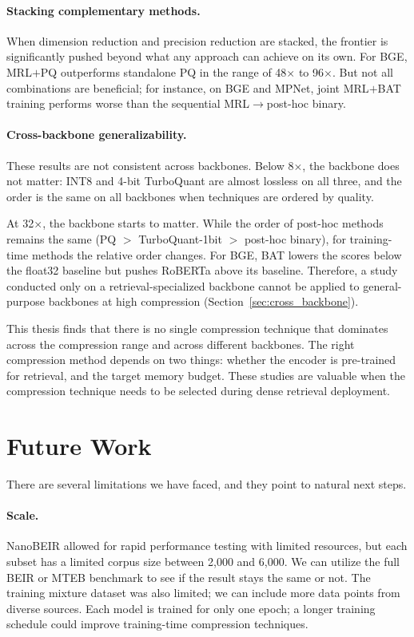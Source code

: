 \paragraph{Stacking complementary methods.}
When dimension reduction and precision reduction are stacked, the
frontier is significantly pushed beyond what any approach can achieve
on its own. For BGE, MRL$+$PQ outperforms standalone PQ in the range
of 48$\times$ to 96$\times$. But not all combinations are beneficial;
for instance, on BGE and MPNet, joint MRL$+$BAT training performs
worse than the sequential MRL$\rightarrow$post-hoc binary.

\paragraph{Cross-backbone generalizability.}
These results are not consistent across backbones. Below 8$\times$,
the backbone does not matter: INT8 and 4-bit TurboQuant are almost
lossless on all three, and the order is the same on all backbones
when techniques are ordered by quality.

At 32$\times$, the backbone starts to matter. While the order of
post-hoc methods remains the same (PQ $>$ TurboQuant-1bit $>$ post-hoc
binary), for training-time methods the relative order changes. For
BGE, BAT lowers the scores below the float32 baseline but pushes
RoBERTa above its baseline. Therefore, a study conducted only on a
retrieval-specialized backbone cannot be applied to general-purpose
backbones at high compression
(Section~\ref{sec:cross_backbone}).

This thesis finds that there is no single compression technique that
dominates across the compression range and across different backbones.
The right compression method depends on two things: whether the
encoder is pre-trained for retrieval, and the target memory budget.
These studies are valuable when the compression technique needs to be
selected during dense retrieval deployment.

\section{Future Work}
\label{sec:future_work}

There are several limitations we have faced, and they point to natural
next steps.

\paragraph{Scale.}
NanoBEIR allowed for rapid performance testing with limited resources,
but each subset has a limited corpus size between 2{,}000 and 6{,}000.
We can utilize the full BEIR or MTEB benchmark to see if the result
stays the same or not. The training mixture dataset was also limited;
we can include more data points from diverse sources. Each model is
trained for only one epoch; a longer training schedule could improve
training-time compression techniques.

